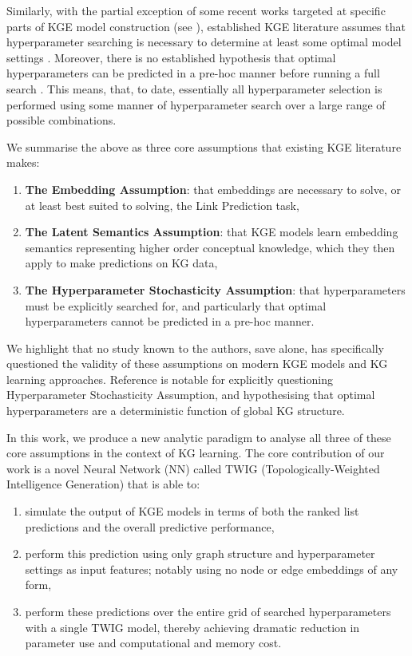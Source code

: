 Similarly, with the partial exception of some recent works targeted at specific parts of KGE model construction (see \cite{neg-samp-analysis,loss-func-analysis,old-dog-new-tricks}), established KGE literature assumes that hyperparameter searching is necessary to determine at least some optimal model settings \cite{light-into-the-dark}. Moreover, there is no established hypothesis that optimal hyperparameters can be predicted in a pre-hoc manner before running a full search \cite{kge-survey,rml-review,kge-completion-rev,kg-ovewview}. This means, that, to date, essentially all hyperparameter selection is performed using some manner of hyperparameter search over a large range of possible combinations.

We summarise the above as three core assumptions that existing KGE literature makes:
\begin{enumerate}
  \item \textbf{The Embedding Assumption}: that embeddings are necessary to solve, or at least best suited to solving, the Link Prediction task,
  \item \textbf{The Latent Semantics Assumption}: that KGE models learn embedding semantics representing higher order conceptual knowledge, which they then apply to make predictions on KG data,
  \item \textbf{The Hyperparameter Stochasticity Assumption}: that hyperparameters must be explicitly searched for, and particularly that optimal hyperparameters cannot be predicted in a pre-hoc manner.
\end{enumerate}

We highlight that no study known to the authors, save \cite{hp-struct-basis} alone, has specifically questioned the validity of these assumptions on modern KGE models and KG learning approaches. Reference \cite{hp-struct-basis} is notable for explicitly questioning Hyperparameter Stochasticity Assumption, and hypothesising that optimal hyperparameters are a deterministic function of global KG structure.

In this work, we produce a new analytic paradigm to analyse all three of these core assumptions in the context of KG learning. The core contribution of our work is a novel Neural Network (NN) called TWIG (Topologically-Weighted Intelligence Generation) that is able to:
\begin{enumerate}
  \item simulate the output of KGE models in terms of both the ranked list predictions and the overall predictive performance,
  \item perform this prediction using only graph structure and hyperparameter settings as input features; notably using no node or edge embeddings of any form,
  \item perform these predictions over the entire grid of searched hyperparameters with a single TWIG model, thereby achieving dramatic reduction in parameter use and computational and memory cost.
\end{enumerate}

